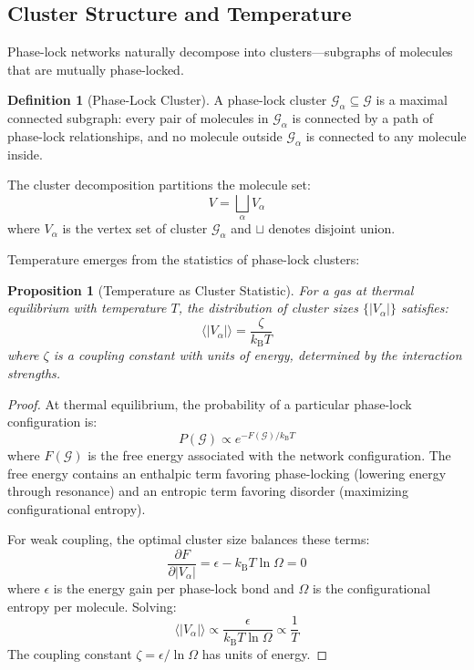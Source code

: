 \documentclass[twocolumn,showpacs,preprintnumbers,amsmath,amssymb,prd]{revtex4-2}
\newtheorem{proposition}[theorem]{Proposition}
\theoremstyle{definition}
\newtheorem{definition}[theorem]{Definition}
\theoremstyle{remark}
\newcommand{\kB}{k_{\mathrm{B}}}
\newcommand{\phaselockgraph}{\mathcal{G}}
\begin{document}
\subsection{Cluster Structure and Temperature}

Phase-lock networks naturally decompose into clusters---subgraphs of molecules that are mutually phase-locked.

\begin{definition}[Phase-Lock Cluster]
\label{def:cluster}
A phase-lock cluster $\phaselockgraph_\alpha \subseteq \phaselockgraph$ is a maximal connected subgraph: every pair of molecules in $\phaselockgraph_\alpha$ is connected by a path of phase-lock relationships, and no molecule outside $\phaselockgraph_\alpha$ is connected to any molecule inside.
\end{definition}

The cluster decomposition partitions the molecule set:
\begin{equation}
V = \bigsqcup_\alpha V_\alpha
\label{eq:partition}
\end{equation}
where $V_\alpha$ is the vertex set of cluster $\phaselockgraph_\alpha$ and $\sqcup$ denotes disjoint union.

Temperature emerges from the statistics of phase-lock clusters:

\begin{proposition}[Temperature as Cluster Statistic]
\label{prop:temperature_cluster}
For a gas at thermal equilibrium with temperature $T$, the distribution of cluster sizes $\{|V_\alpha|\}$ satisfies:
\begin{equation}
\langle |V_\alpha| \rangle = \frac{\zeta}{\kB T}
\label{eq:cluster_size}
\end{equation}
where $\zeta$ is a coupling constant with units of energy, determined by the interaction strengths.
\end{proposition}

\begin{proof}
At thermal equilibrium, the probability of a particular phase-lock configuration is:
\begin{equation}
P(\phaselockgraph) \propto e^{-F(\phaselockgraph)/\kB T}
\end{equation}
where $F(\phaselockgraph)$ is the free energy associated with the network configuration. The free energy contains an enthalpic term favoring phase-locking (lowering energy through resonance) and an entropic term favoring disorder (maximizing configurational entropy).

For weak coupling, the optimal cluster size balances these terms:
\begin{equation}
\frac{\partial F}{\partial |V_\alpha|} = \epsilon - \kB T \ln\Omega = 0
\end{equation}
where $\epsilon$ is the energy gain per phase-lock bond and $\Omega$ is the configurational entropy per molecule. Solving:
\begin{equation}
\langle |V_\alpha| \rangle \propto \frac{\epsilon}{\kB T \ln\Omega} \propto \frac{1}{T}
\end{equation}
The coupling constant $\zeta = \epsilon/\ln\Omega$ has units of energy.
\end{proof}
\end{document}
